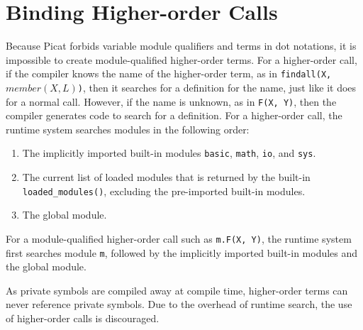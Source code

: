 \section{Binding Higher-order Calls}
Because Picat forbids variable module qualifiers and terms in dot notations, it is impossible to create module-qualified higher-order terms. For a higher-order call, if the compiler knows the name of the higher-order term, as in \texttt{findall(X, $member(X, L)$)}, then it searches for a definition for the name, just like it does for a normal call. However, if the name is unknown, as in \texttt{F(X, Y)}, then the compiler generates code to search for a definition. For a higher-order call, the runtime system searches modules in the following order:
\begin{enumerate}
\item The implicitly imported built-in modules \texttt{basic}, \texttt{math}, \texttt{io}, and \texttt{sys}.
\item The current list of loaded modules that is returned by the built-in \texttt{loaded\_modules()}, excluding the pre-imported built-in modules.
\item The global module.
\end{enumerate}
For a module-qualified higher-order call such as \texttt{m.F(X, Y)}, the runtime system first searches module \texttt{m}, followed by the implicitly imported built-in modules and the global module.

As private symbols are compiled away at compile time, higher-order terms can never reference private symbols. Due to the overhead of runtime search, the use of higher-order calls is discouraged.

